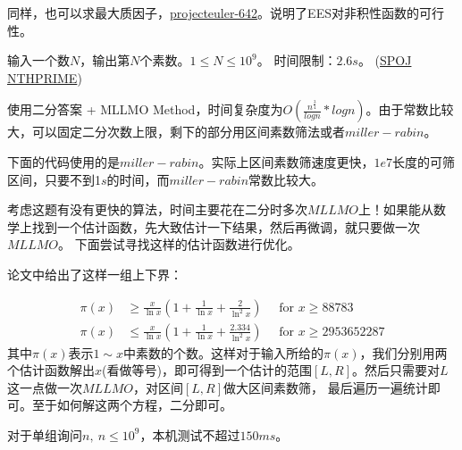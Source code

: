 \begin{note}
	同样，也可以求最大质因子，\href{https://projecteuler.net/problem=642}{projecteuler-642}。说明了EES对非积性函数的可行性。
\end{note} 
 
 
 
 
\vbox{}




\begin{example}
输入一个数$N$，输出第$N$个素数。$1\le N\le 10^9$。 时间限制：$2.6s$。
(\href{https://www.spoj.com/problems/NTHPRIME/en/}{SPOJ NTHPRIME})
\end{example}

\begin{solution}
	使用二分答案 + MLLMO Method，时间复杂度为$O(\frac {n^{\frac 3 4}}{ log n} * log n)$。由于常数比较大，可以固定二分次数上限，剩下的部分用区间素数筛法或者$miller-rabin$。
	
	下面的代码使用的是$miller-rabin$。{\heiti 实际上区间素数筛速度更快，$1e7$长度的可筛区间，只要不到1$s$的时间，而$miller-rabin$常数比较大。}
\end{solution}



\begin{note}
考虑这题有没有更快的算法，时间主要花在二分时多次$MLLMO$上！如果能从数学上找到一个估计函数，先大致估计一下结果，然后再微调，就只要做一次$MLLMO$。
下面尝试寻找这样的估计函数进行优化。
\end{note}

\vbox{}

论文\cite{1002.0442}中给出了这样一组上下界：

$$
\begin{aligned} \pi(x) & \geqslant \frac{x}{\ln x}\left(1+\frac{1}{\ln x}+\frac{2}{\ln ^{2} x}\right) \quad \text { for } x \geqslant 88783 \\ \pi(x) & \leqslant \frac{x}{\ln x}\left(1+\frac{1}{\ln x}+\frac{2.334}{\ln ^{2} x}\right) \quad \text { for } x \geqslant 2953652287 \end{aligned}
$$
其中$\pi(x)$表示$1\sim x$中素数的个数。这样对于输入所给的$\pi(x)$，我们分别用两个估计函数解出$x$(看做等号)，即可得到一个估计的范围$[L,R]$。然后只需要对$L$这一点做一次$MLLMO$，对区间$[L,R]$做大区间素数筛，
最后遍历一遍统计即可。至于如何解这两个方程，二分即可。

对于单组询问$n,\ n\le 10^9$，本机测试不超过$150ms$。





